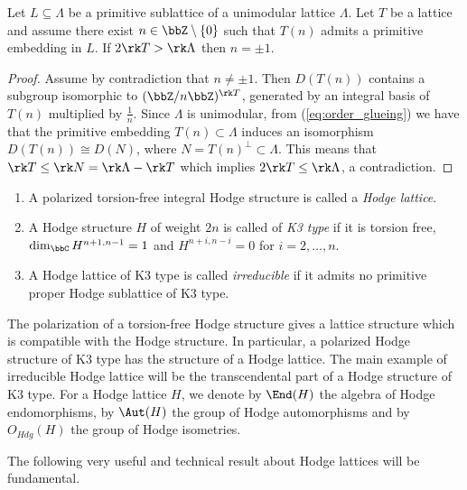 \documentclass{amsart}
\begin{document}
\begin{lemma}\label{lem:lenght_discriminant}
    Let \(L\subseteq \Lambda\) be a primitive sublattice of a unimodular lattice \(\Lambda\). Let \(T\) be a lattice and assume there exist \(n\in \bbZ\setminus \{0\}\) such that \(T(n)\) admits a primitive embedding in \(L\). If \(2\rk T >\rk \Lambda \) then \(n=\pm 1\).
\end{lemma}
\begin{proof}
    Assume by contradiction that \(n\not =\pm 1\). Then \(D({T(n)})\) contains a subgroup isomorphic to \((\bbZ/n\bbZ)^{\rk T}\), generated by an integral basis of \(T(n)\) multiplied by \(\frac{1}{n}\). Since \(\Lambda\) is unimodular, from (\ref{eq:order_glueing}) we have that the primitive embedding \(T(n)\subset \Lambda\) induces an isomorphism \(D({T(n)})\cong D(N)\), where \(N=T(n)^\perp\subset \Lambda\). This means that \(\rk T\leq \rk N=\rk \Lambda- \rk T\) which implies \(2\rk T\leq \rk \Lambda\), a contradiction. 
\end{proof}



\begin{definition}
    \begin{enumerate}
        
        \item[1)] A polarized torsion-free integral Hodge structure is called a \textit{Hodge lattice}. 
        \item[2)] A Hodge structure \(H\) of weight \(2n\) is called of \textit{K3 type} if it is torsion free, \(\dim_\bbC H^{n+1,n-1}=1\) and \(H^{n+i,n-i}=0\) for \(i=2,\dots, n\). 
        \item[3)]
        A Hodge lattice of K3 type is called \textit{irreducible} if it admits no primitive proper Hodge sublattice of K3 type.
    \end{enumerate}
\end{definition}


The polarization of a torsion-free Hodge structure gives a lattice structure which is compatible with the Hodge structure. In particular, a polarized Hodge structure of K3 type has the structure of a Hodge lattice. The main example of irreducible Hodge lattice will be the transcendental part of a Hodge structure of K3 type.
For a Hodge lattice \(H\), we denote by \(\End(H)\) the algebra of Hodge endomorphisms, by \(\Aut(H)\) the group of Hodge automorphisms and by \(O_{Hdg}(H)\) the group of Hodge isometries.

The following very useful and technical result about Hodge lattices will be fundamental.
\end{document}
